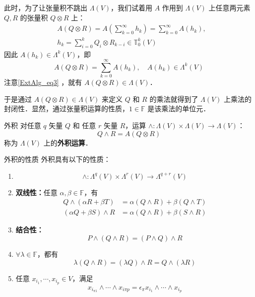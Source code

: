 此时，为了让张量积不跳出 $\Lambda(V)$，我们试着用 $A$ 作用到 $\Lambda(V)$ 上任意两元素 $Q,R$ 的张量积 $Q\otimes R$ 上：
\begin{equation}
\begin{aligned}
&A(Q\otimes R)=A(\sum_{k=0}^\infty h_k)=\sum_{k=0}^\infty  A(h_k),\\
&h_k=\sum_{i=0}^k Q_i\otimes R_{k-i}\in\mathbb T_0^k(V)
\end{aligned}
\end{equation}
因此 $A(h_k)\in \Lambda^{k}(V)$，即
\begin{equation}
A(Q\otimes R)=\sum_{k=0}^\infty  A(h_k),\quad A(h_k)\in\Lambda^k(V)
\end{equation}
注意\autoref{ExtAlg_eq3} ，就有 $A(Q\otimes R)\in\Lambda(V)$．

于是通过 $A(Q\otimes R)\in\Lambda(V)$ 来定义 $Q$ 和 $R$ 的乘法就得到了 $\Lambda(V)$ 上乘法的封闭性．显然，通过张量积运算的性质，$1\in\mathbb F$ 是该乘法的单位元．
\begin{definition}{外积}\label{ExtAlg_def1}
对任意 $q$ 矢量 $Q$ 和 任意 $r$ 矢量 $R$，运算 $\wedge:\Lambda(V)\times\Lambda(V)\rightarrow\Lambda(V)$：
\begin{equation}
Q\wedge R=A(Q\otimes R)
\end{equation}
称为 $\Lambda(V)$ 上的\textbf{外积运算}．
\end{definition}
\begin{theorem}{外积的性质}
外积具有以下的性质：
\begin{enumerate}
\item \begin{equation}\label{ExtAlg_eq1}
\wedge:\Lambda^q(V)\times\Lambda^r(V)\rightarrow\Lambda^{q+r}(V)
\end{equation}
\item \textbf{双线性：}任意 $\alpha,\beta\in\mathbb F$，有
\begin{equation}
\begin{aligned}
Q\wedge(\alpha R+\beta T)&=\alpha(Q\wedge R)+\beta(Q\wedge T)\\
(\alpha Q+\beta S)\wedge R&=\alpha (Q\wedge R)+\beta (S\wedge R)
\end{aligned}
\end{equation}
\item \textbf{结合性：}
\begin{equation}
P\wedge (Q\wedge R)=(P\wedge Q)\wedge R
\end{equation}
\item $\forall \lambda\in\mathbb F$，都有
\begin{equation}\label{ExtAlg_eq4}
\lambda(Q\wedge R)=(\lambda Q)\wedge R=Q\wedge(\lambda R)
\end{equation}

\item 任意 $x_{i_1},\cdots,x_{i_p}\in V$，满足
\begin{equation}\label{ExtAlg_eq6}
x_{i_{\pi 1}}\wedge\cdots \wedge x_{i\pi p}=\epsilon_\pi x_{i_1}\wedge\cdots\wedge x_{i_p}
\end{equation}

\end{enumerate}

\end{theorem}
